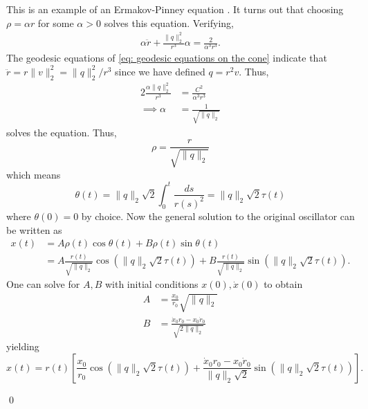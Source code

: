 \documentclass{article}
\begin{document}
This is an example of an Ermakov-Pinney equation \cite{ermakov1880equations, pinney1950nonlinear}. It turns out that choosing $\rho  = \alpha r$ for some $\alpha > 0$ solves this equation. Verifying,
\begin{align}
    \alpha\ddot r + \frac{\|q\|_2^2}{r^3}\alpha = \frac{2}{\alpha^3r^3}.
\end{align}
The geodesic equations of \cref{eq: geodesic equations on the cone} indicate that $\ddot r = r\|v\|^2_2 = \|q\|_2^2/r^3$ since we have defined $q = r^2v$. Thus,
\begin{align}
    2\frac{\alpha\|q\|_2^2}{r^3} &= \frac{C^2}{\alpha^3r^3} \\
    \implies \alpha &= \frac{1}{\sqrt{\|q\|_2}}
\end{align}
solves the equation. Thus,
\[\rho = \frac{r}{\sqrt{\|q\|_2}}\]
which means
\[\theta(t) = \|q\|_2\sqrt{2}\int_0^t\frac{ds}{r(s)^2} = \|q\|_2\sqrt{2}\tau(t)\]
where $\theta(0) = 0$ by choice. Now the general solution to the original oscillator can be written as 
\begin{align*}
    x(t) &= A\rho(t)\cos\theta(t) + B\rho(t)\sin\theta(t) \\
    &= A\frac{r(t)}{\sqrt{\|q\|_2}}\cos(\|q\|_2\sqrt{2}\tau(t)) + B\frac{r(t)}{\sqrt{\|q\|_2}}\sin(\|q\|_2\sqrt{2}\tau(t)).
\end{align*}
One can solve for $A,B$ with initial conditions $x(0), \dot{x}(0)$ to obtain
\begin{align*}
    A &= \frac{x_0}{r_0}\sqrt{\|q\|_2} \\
    B &= \frac{\dot x_0 r_0 - x_0\dot r_0}{\sqrt{2\|q\|_2}}
\end{align*}
yielding
\begin{equation}
    x(t) = r(t)\left[\frac{x_0}{r_0}\cos(\|q\|_2\sqrt{2}\tau(t)) + \frac{\dot x_0 r_0 - x_0 \dot r_0}{\|q\|_2\sqrt{2}}\sin(\|q\|_2\sqrt{2}\tau(t))\right].
\end{equation}

\qed{}

{}
\end{document}
